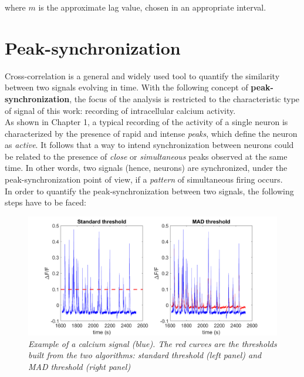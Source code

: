 \documentclass[12pt, a4paper]{report}
\begin{document}
where $m$ is the approximate lag value, chosen in an appropriate interval.



\section{Peak-synchronization} \label{section 2.3}

Cross-correlation is a general and widely used tool to quantify the similarity between two signals evolving in time. With the following concept of \textbf{peak-synchronization}, the focus of the analysis is restricted to the characteristic type of signal of this work: recording of intracellular calcium activity.\\
As shown in Chapter 1, a typical recording of the activity of a single neuron is characterized by the presence of rapid and intense \textit{peaks}, which define the neuron as \textit{active}. It follows that a way to intend synchronization between neurons could be related to the presence of \textit{close} or \textit{simultaneous} peaks observed at the same time. In other words, two signals (hence, neurons) are synchronized, under the peak-synchronization point of view, if a \textit{pattern} of simultaneous firing occurs. 
\\

In order to quantify the peak-synchronization between two signals, the following steps have to be faced:

\begin{figure}[H]
	\begin{center}
		\hspace*{-0.7 cm}
		\includegraphics[scale=.45]{thresholds.png} 
	\end{center} 
	\caption{\textit{Example of a calcium signal (blue). The red curves are the thresholds built from the two algorithms: standard threshold (left panel) and MAD threshold (right panel)}} \label{threshold}
	
\end{figure}
\end{document}
